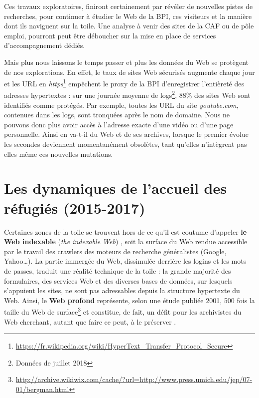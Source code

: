 \documentclass[symmetric,justified,marginals=raggedouter]{tufte-book}
\begin{document}
Ces travaux exploratoires, finiront certainement par révéler de nouvelles pistes de recherches, pour continuer à étudier le Web de la BPI, ces visiteurs et la manière dont ils naviguent sur la toile. Une analyse à venir des sites de la CAF ou de pôle emploi, pourront peut être déboucher sur la mise en place de services d'accompagnement dédiés. 

Mais plus nous laissons le temps passer et plus les données du Web se protègent de nos explorations. En effet, le taux de sites Web sécurisés augmente chaque jour et les URL en \textit{https}\footnote{\RaggedOuter \url{https://fr.wikipedia.org/wiki/HyperText\_Transfer\_Protocol\_Secure}} empêchent le proxy de la BPI d'enregistrer l'entièreté des adresses hypertextes : sur une journée moyenne de logs\footnote{\RaggedOuter Données de juillet 2018}, $88\%$ des sites Web sont identifiés comme protégés. Par exemple, toutes les URL du site \textit{youtube.com}, contenues dans les logs, sont tronquées après le nom de domaine. Nous ne pouvons donc plus avoir accès à l'adresse exacte d'une vidéo ou d'une page personnelle. Ainsi en va-t-il du Web et de ses archives, lorsque le premier évolue les secondes deviennent momentanément obsolètes, tant qu'elles n'intègrent pas elles même ces nouvelles mutations. 

\section{Les dynamiques de l'accueil des réfugiés (2015-2017)} 
\label{sec:7_calm}

\noindent Certaines zones de la toile se trouvent hors de ce qu'il est coutume d'appeler \textbf{le Web indexable} (\textit{the indexable Web}) \citep{lawrence_searching_1998}, soit la surface du Web rendue accessible par le travail des crawlers des moteurs de recherche généralistes (Google, Yahoo\ldots{}). La partie immergée du Web, dissimulée derrière les logins et les mots de passes, traduit une réalité technique de la toile : la grande majorité des formulaires, des services Web et des diverses bases de données, sur lesquels s'appuient les sites, ne sont pas adressables depuis la structure hypertexte du Web. Ainsi, le \textbf{Web profond} \citep{bergman_white_2001} représente, selon une étude publiée 2001, 500 fois la taille du Web de surface\footnote{\RaggedOuter \url{http://archive.wikiwix.com/cache/?url=http://www.press.umich.edu/jep/07-01/bergman.html}} et constitue, de fait, un défit pour les archivistes du Web cherchant, autant que faire ce peut, à le préserver \citep{masanes_archiving_2006}.
\end{document}
